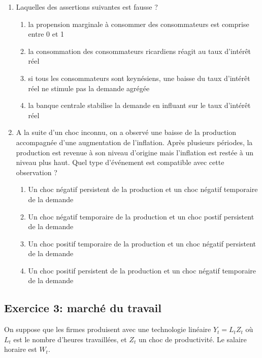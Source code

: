 \documentclass{article}
\providecommand{\tightlist}{%
  \setlength{\itemsep}{0pt}\setlength{\parskip}{0pt}}
\begin{document}
\begin{enumerate}

\item Laquelles des assertions suivantes est fausse ?

\begin{enumerate}
\tightlist
\item
  la propension marginale à consommer des consommateurs est comprise
  entre 0 et 1
\item
  la consommation des consommateurs ricardiens réagit au taux d'intérêt
  réel
\item
  si tous les consommateurs sont keynésiens, une baisse du taux
  d'intérêt réel ne stimule pas la demande agrégée
\item
  la banque centrale stabilise la demande en influant sur le taux
  d'intérêt réel
\end{enumerate}

\item A la suite d'un choc inconnu, on a observé une baisse de la
production accompagnée d'une augmentation de l'inflation. Après
plusieurs périodes, la production est revenue à son niveau d'origine
mais l'inflation est restée à un niveau plus haut. Quel type d'événement
est compatible avec cette observation ?

\begin{enumerate}
\tightlist
\item
  Un choc négatif persistent de la production et un choc négatif
  temporaire de la demande
\item
  Un choc négatif temporaire de la production et un choc postif
  persistent de la demande
\item
  Un choc positif temporaire de la production et un choc négatif
  persistent de la demande
\item
  Un choc positif persistent de la production et un choc négatif
  temporaire de la demande
\end{enumerate}

\end{enumerate}


\hypertarget{mcq}{\subsection{Exercice 3: marché du travail}\label{exo3}}


On suppose que les firmes produisent avec une technologie linéaire
\(Y_t = L_t Z_t\) où \(L_t\) est le nombre d'heures travaillées, et
\(Z_t\) un choc de productivité. Le salaire horaire est \(W_t\).
\end{document}

